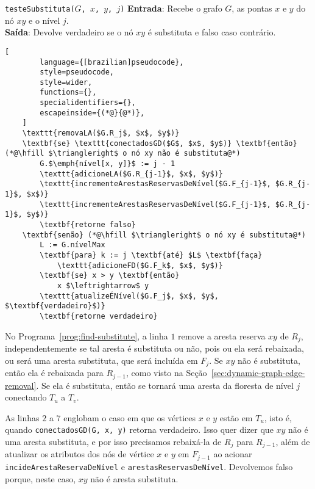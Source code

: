 \begin{programruledcaption}{\texttt{testeSubstituta($G$, $x$, $y$, $j$)} \label{prog:find-substitute}}
    \noindent\textbf{Entrada}: Recebe o grafo $G$, as pontas $x$ e $y$ do nó $xy$ e o nível $j$.\\
    \textbf{Saída}: Devolve verdadeiro se o nó $xy$ é substituta e falso caso contrário.
    \vspace{-0.5\baselineskip}
    \begin{lstlisting}[
        language={[brazilian]pseudocode},
        style=pseudocode,
        style=wider,
        functions={},
        specialidentifiers={},
        escapeinside={(*@}{@*)},
    ]
    \texttt{removaLA($G.R_j$, $x$, $y$)} 
    \textbf{se} \texttt{conectadosGD($G$, $x$, $y$)} \textbf{então} (*@\hfill $\triangleright$ o nó xy não é substituta@*)
        G.$\emph{nível[x, y]}$ := j - 1
        \texttt{adicioneLA($G.R_{j-1}$, $x$, $y$)}
        \texttt{incrementeArestasReservasDeNível($G.F_{j-1}$, $G.R_{j-1}$, $x$)}
        \texttt{incrementeArestasReservasDeNível($G.F_{j-1}$, $G.R_{j-1}$, $y$)}
        \textbf{retorne falso}
    \textbf{senão} (*@\hfill $\triangleright$ o nó xy é substituta@*)
        L := G.nívelMax
        \textbf{para} k := j \textbf{até} $L$ \textbf{faça}
            \texttt{adicioneFD($G.F_k$, $x$, $y$)}
        \textbf{se} x > y \textbf{então}
            x $\leftrightarrow$ y
        \texttt{atualizeÉNível($G.F_j$, $x$, $y$, $\textbf{verdadeiro}$)}
        \textbf{retorne verdadeiro}
    \end{lstlisting}
    \vspace{-0.5\baselineskip}
\end{programruledcaption}

No Programa~\ref{prog:find-substitute}, a linha $1$ remove a aresta reserva $xy$ de $R_j$, independentemente se tal aresta é substituta ou não, pois ou ela será rebaixada, ou será uma aresta substituta, que será incluída em $F_j$. Se $xy$ não é substituta, então ela é rebaixada para $R_{j-1}$, como visto na Seção~\ref{sec:dynamic-graph-edge-removal}. Se ela é substituta, então se tornará uma aresta da floresta de nível $j$ conectando $T_u$ a $T_v$.

As linhas $2$ a $7$ englobam o caso em que os vértices $x$ e $y$ estão em $T_u$, isto é, quando \texttt{conectadosGD(G, x, y)} retorna verdadeiro. Isso quer dizer que $xy$ não é uma aresta substituta, e por isso precisamos rebaixá-la de $R_j$ para $R_{j-1}$, além de atualizar os atributos dos nós de vértice $x$ e $y$ em $F_{j-1}$ ao acionar \texttt{incideArestaReservaDeNível} e \texttt{arestasReservasDeNível}. Devolvemos falso porque, neste caso, $xy$ não é aresta substituta.

